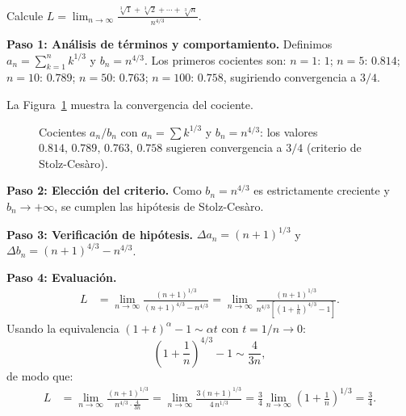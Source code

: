 \begin{example}
Calcule $\displaystyle L = \lim_{n \to \infty}
\frac{\sqrt[3]{1} + \sqrt[3]{2} + \cdots + \sqrt[3]{n}}{n^{4/3}}$.
\begin{myproof}
\textbf{Paso 1: Análisis de términos y comportamiento.}
Definimos $a_n = \sum_{k=1}^n k^{1/3}$ y $b_n = n^{4/3}$. Los primeros
cocientes son: $n=1$: $1$; $n=5$: $0.814$; $n=10$: $0.789$;
$n=50$: $0.763$; $n=100$: $0.758$, sugiriendo convergencia a $3/4$.

La Figura~\ref{fig:cociente_stolz} muestra la convergencia del cociente.

\begin{figure}[H]
\centering
{}
\caption{Cocientes $a_n/b_n$ con $a_n=\sum k^{1/3}$ y $b_n=n^{4/3}$: los valores $0.814,\,0.789,\,0.763,\,0.758$ sugieren convergencia a $3/4$ (criterio de Stolz-Cesàro).}
\label{fig:cociente_stolz}
\end{figure}

\textbf{Paso 2: Elección del criterio.}
Como $b_n = n^{4/3}$ es estrictamente creciente y $b_n \to +\infty$,
se cumplen las hipótesis de Stolz-Cesàro.

\textbf{Paso 3: Verificación de hipótesis.}
$\Delta a_n = (n+1)^{1/3}$ y $\Delta b_n = (n+1)^{4/3} - n^{4/3}$.

\textbf{Paso 4: Evaluación.}
\begin{align*}
  L &= \lim_{n\to\infty}
       \frac{(n+1)^{1/3}}{(n+1)^{4/3} - n^{4/3}}
     = \lim_{n\to\infty}
       \frac{(n+1)^{1/3}}{n^{4/3}\!\left[\left(1+\frac{1}{n}\right)^{4/3}-1\right]}.
\end{align*}
Usando la equivalencia $(1+t)^\alpha - 1 \sim \alpha t$ con
$t = 1/n \to 0$:
\[
  \left(1+\frac{1}{n}\right)^{4/3} - 1 \sim \frac{4}{3n},
\]
de modo que:
\begin{align*}
  L &= \lim_{n\to\infty}
       \frac{(n+1)^{1/3}}{n^{4/3} \cdot \frac{4}{3n}}
     = \lim_{n\to\infty}
       \frac{3(n+1)^{1/3}}{4\,n^{1/3}}
     = \frac{3}{4}\lim_{n\to\infty}\left(1+\frac{1}{n}\right)^{1/3}
     = \boxed{\frac{3}{4}}.
\end{align*}
\end{myproof}
\end{example}

